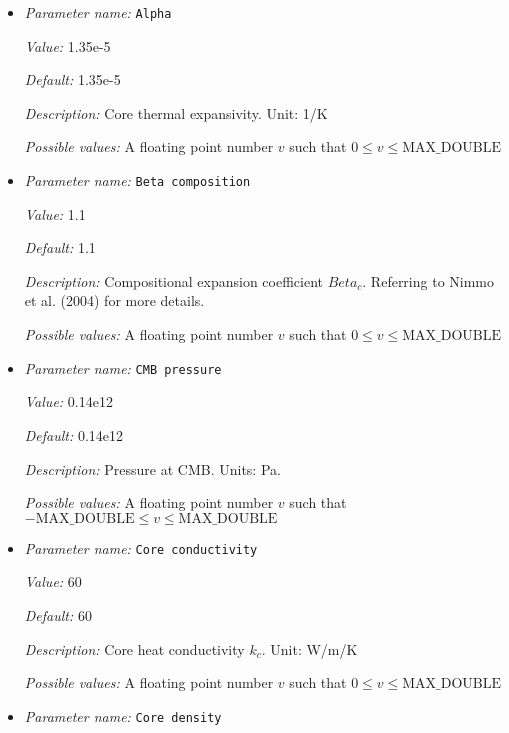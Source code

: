 \begin{itemize}
\item {\it Parameter name:} {\tt Alpha}
\label{parameters:Boundary temperature model/Dynamic core/Alpha}


{\it Value:} 1.35e-5


{\it Default:} 1.35e-5


{\it Description:} Core thermal expansivity. Unit: 1/K


{\it Possible values:} A floating point number $v$ such that $0 \leq v \leq \text{MAX\_DOUBLE}$
\item {\it Parameter name:} {\tt Beta composition}
\label{parameters:Boundary temperature model/Dynamic core/Beta composition}


{\it Value:} 1.1


{\it Default:} 1.1


{\it Description:} Compositional expansion coefficient $Beta_c$. Referring to Nimmo et al. (2004) for more details.


{\it Possible values:} A floating point number $v$ such that $0 \leq v \leq \text{MAX\_DOUBLE}$
\item {\it Parameter name:} {\tt CMB pressure}
\label{parameters:Boundary temperature model/Dynamic core/CMB pressure}


{\it Value:} 0.14e12


{\it Default:} 0.14e12


{\it Description:} Pressure at CMB. Units: Pa.


{\it Possible values:} A floating point number $v$ such that $-\text{MAX\_DOUBLE} \leq v \leq \text{MAX\_DOUBLE}$
\item {\it Parameter name:} {\tt Core conductivity}
\label{parameters:Boundary temperature model/Dynamic core/Core conductivity}


{\it Value:} 60


{\it Default:} 60


{\it Description:} Core heat conductivity $k_c$. Unit: W/m/K


{\it Possible values:} A floating point number $v$ such that $0 \leq v \leq \text{MAX\_DOUBLE}$
\item {\it Parameter name:} {\tt Core density}
\label{parameters:Boundary temperature model/Dynamic core/Core density}



\end{itemize}
